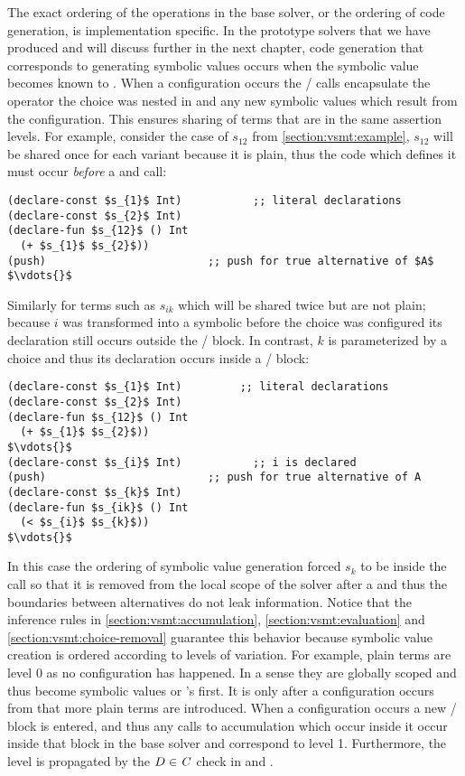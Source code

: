 The exact ordering of the operations in the base solver, or the ordering of code
generation, is implementation specific. In the prototype solvers that we have
produced and will discuss further in the next chapter, code generation that
corresponds to generating symbolic values occurs when the symbolic value becomes
known to \aStore. When a configuration occurs the / calls
encapsulate the operator the choice was nested in and any new symbolic values
which result from the configuration. This ensures sharing of terms that are in
the same assertion levels. For example, consider the case of $s_{12}$ from
\autoref{section:vsmt:example}, $s_{12}$ will be shared once for each variant
because it is plain, thus the code which defines it must occur \emph{before} a
 and  call:
%
\begin{lstlisting}[columns=flexible,keepspaces=true,language=SMTLIB]
(declare-const $s_{1}$ Int)           ;; literal declarations
(declare-const $s_{2}$ Int)
(declare-fun $s_{12}$ () Int
  (+ $s_{1}$ $s_{2}$))
(push)                         ;; push for true alternative of $A$
$\vdots{}$
\end{lstlisting}
%
Similarly for terms such as $s_{ik}$ which will be shared twice but are not
plain; because $i$ was transformed into a symbolic before the choice was
configured its declaration still occurs outside the / block. In
contrast, $k$ is parameterized by a choice and thus its declaration occurs
inside a / block:
% 
\begin{lstlisting}[columns=flexible,keepspaces=true,language=SMTLIB,breaklines=true]
(declare-const $s_{1}$ Int)         ;; literal declarations
(declare-const $s_{2}$ Int)
(declare-fun $s_{12}$ () Int
  (+ $s_{1}$ $s_{2}$))
$\vdots{}$
(declare-const $s_{i}$ Int)           ;; i is declared
(push)                         ;; push for true alternative of A
(declare-const $s_{k}$ Int)
(declare-fun $s_{ik}$ () Int
  (< $s_{i}$ $s_{k}$))
$\vdots{}$
\end{lstlisting}
% 
In this case the ordering of symbolic value generation forced $s_{k}$ to be
inside the  call so that it is removed from the local scope of the
solver after a  and thus the boundaries between alternatives do not leak
information. Notice that the inference rules in
\autoref{section:vsmt:accumulation}, \autoref{section:vsmt:evaluation} and
\autoref{section:vsmt:choice-removal} guarantee this behavior because symbolic
value creation is ordered according to levels of variation. For example, plain
terms are level 0 as no configuration has happened. In a sense they are globally
scoped and thus become symbolic values or \unit{}'s first. It is only after a
configuration occurs from \crChc{} that more plain terms are introduced. When a
configuration occurs a new / block is entered, and thus any
calls to accumulation which occur inside it occur inside that block in the base
solver and correspond to level 1. Furthermore, the level is propagated by the $D
\in \mathit{C}$ check in \crChcT{} and \crChcF{}.

